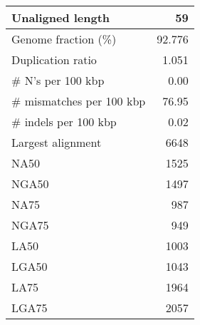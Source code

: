 \documentclass[12pt,a4paper]{article}
\begin{document}
\begin{table}[ht]
\begin{center}
\begin{tabular}{|l*{1}{|r}|}
Unaligned length & 59 \\ \hline
Genome fraction (\%) & 92.776 \\ \hline
Duplication ratio & 1.051 \\ \hline
\# N's per 100 kbp & 0.00 \\ \hline
\# mismatches per 100 kbp & 76.95 \\ \hline
\# indels per 100 kbp & 0.02 \\ \hline
Largest alignment & 6648 \\ \hline
NA50 & 1525 \\ \hline
NGA50 & 1497 \\ \hline
NA75 & 987 \\ \hline
NGA75 & 949 \\ \hline
LA50 & 1003 \\ \hline
LGA50 & 1043 \\ \hline
LA75 & 1964 \\ \hline
LGA75 & 2057 \\ \hline
\end{tabular}
\end{center}
\end{table}
\end{document}
